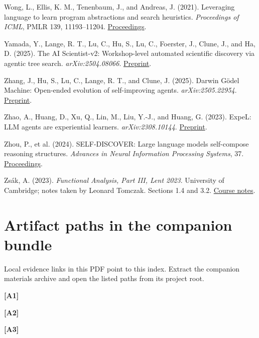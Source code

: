 \documentclass[11pt,a4paper]{article}
\begin{document}
Wong, L., Ellis, K. M., Tenenbaum, J., and Andreas, J. (2021). Leveraging language to learn program abstractions and search heuristics. \emph{Proceedings of ICML}, PMLR 139, 11193–11204. \href{https://proceedings.mlr.press/v139/wong21a.html}{Proceedings}.


Yamada, Y., Lange, R. T., Lu, C., Hu, S., Lu, C., Foerster, J., Clune, J., and Ha, D. (2025). The AI Scientist-v2: Workshop-level automated scientific discovery via agentic tree search. \emph{arXiv:2504.08066}. \href{https://arxiv.org/abs/2504.08066}{Preprint}.


Zhang, J., Hu, S., Lu, C., Lange, R. T., and Clune, J. (2025). Darwin Gödel Machine: Open-ended evolution of self-improving agents. \emph{arXiv:2505.22954}. \href{https://arxiv.org/abs/2505.22954}{Preprint}.


Zhao, A., Huang, D., Xu, Q., Lin, M., Liu, Y.-J., and Huang, G. (2023). ExpeL: LLM agents are experiential learners. \emph{arXiv:2308.10144}. \href{https://arxiv.org/abs/2308.10144}{Preprint}.


Zhou, P., et al. (2024). SELF-DISCOVER: Large language models self-compose reasoning structures. \emph{Advances in Neural Information Processing Systems}, 37. \href{https://proceedings.nips.cc/paper_files/paper/2024/hash/e41efb03e20ca3c231940a3c6917ef6f-Abstract-Conference.html}{Proceedings}.


Zsák, A. (2023). \emph{Functional Analysis, Part III, Lent 2023}. University of Cambridge; notes taken by Leonard Tomczak. Sections 1.4 and 3.2. \href{https://math.berkeley.edu/~ltomczak/notes/Lent2023/FuncAna_Notes.pdf}{Course notes}.


\endgroup

\clearpage

\section*{Artifact paths in the companion bundle}
Local evidence links in this PDF point to this index. Extract the companion materials archive and open the listed paths from its project root.

\par\hypertarget{artifact-1}{}\textbf{[A1]} 

\par\hypertarget{artifact-2}{}\textbf{[A2]} 

\par\hypertarget{artifact-3}{}\textbf{[A3]} 
\end{document}
